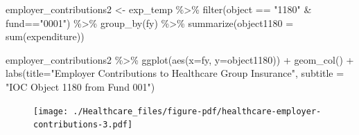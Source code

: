\documentclass[
  letterpaper,
  DIV=11,
  numbers=noendperiod]{scrreport}
\newenvironment{Shaded}{\begin{snugshade}}{\end{snugshade}}
\newcommand{\AttributeTok}[1]{\textcolor[rgb]{0.40,0.45,0.13}{#1}}
\newcommand{\FunctionTok}[1]{\textcolor[rgb]{0.28,0.35,0.67}{#1}}
\newcommand{\NormalTok}[1]{\textcolor[rgb]{0.00,0.23,0.31}{#1}}
\newcommand{\OtherTok}[1]{\textcolor[rgb]{0.00,0.23,0.31}{#1}}
\newcommand{\SpecialCharTok}[1]{\textcolor[rgb]{0.37,0.37,0.37}{#1}}
\newcommand{\StringTok}[1]{\textcolor[rgb]{0.13,0.47,0.30}{#1}}
\begin{document}
\begin{Shaded}
\begin{Highlighting}[]
\NormalTok{employer\_contributions2 }\OtherTok{\textless{}{-}}\NormalTok{ exp\_temp }\SpecialCharTok{\%\textgreater{}\%} 
  \FunctionTok{filter}\NormalTok{(object }\SpecialCharTok{==} \StringTok{"1180"} \SpecialCharTok{\&}\NormalTok{ fund}\SpecialCharTok{==}\StringTok{"0001"}\NormalTok{) }\SpecialCharTok{\%\textgreater{}\%} 
  \FunctionTok{group\_by}\NormalTok{(fy) }\SpecialCharTok{\%\textgreater{}\%} 
  \FunctionTok{summarize}\NormalTok{(}\AttributeTok{object1180 =} \FunctionTok{sum}\NormalTok{(expenditure)) }

\NormalTok{employer\_contributions2 }\SpecialCharTok{\%\textgreater{}\%} 
  \FunctionTok{ggplot}\NormalTok{(}\FunctionTok{aes}\NormalTok{(}\AttributeTok{x=}\NormalTok{fy, }\AttributeTok{y=}\NormalTok{object1180)) }\SpecialCharTok{+} 
  \FunctionTok{geom\_col}\NormalTok{() }\SpecialCharTok{+} 
  \FunctionTok{labs}\NormalTok{(}\AttributeTok{title=}\StringTok{"Employer Contributions to Healthcare Group Insurance"}\NormalTok{, }
       \AttributeTok{subtitle =} \StringTok{"IOC Object 1180 from Fund 001"}\NormalTok{)}
\end{Highlighting}
\end{Shaded}

\begin{figure}[H]

{\centering \texttt{[image: ./Healthcare\_files/figure-pdf/healthcare-employer-contributions-3.pdf]}

}

\end{figure}
\end{document}
